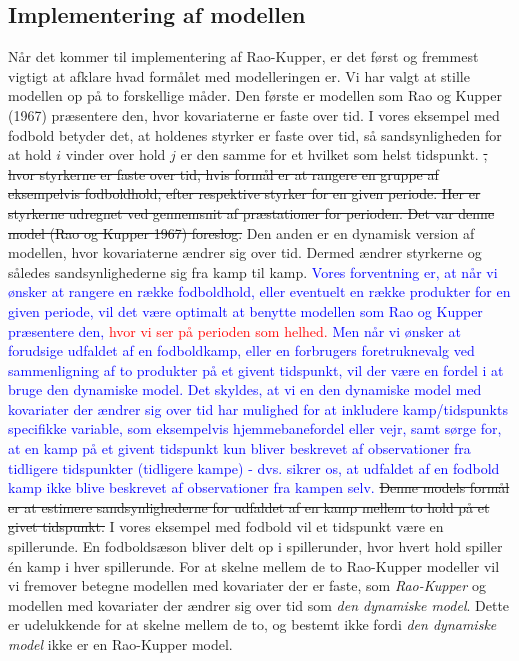 \documentclass[11pt,a4paper]{article}
\begin{document}
\subsection{Implementering af modellen}
Når det kommer til implementering af Rao-Kupper, er det først og fremmest vigtigt at afklare hvad formålet med modelleringen er. Vi har valgt at stille modellen op på to forskellige måder. Den første er modellen som Rao og Kupper (1967)\cite{RaoKupper} præsentere den, hvor kovariaterne er faste over tid. I vores eksempel med fodbold betyder det, at holdenes styrker er faste over tid, så sandsynligheden for at hold $i$ vinder over hold $j$ er den samme for et hvilket som helst tidspunkt.
\sout{, hvor styrkerne er faste over tid, hvis formål er at rangere en gruppe af eksempelvis fodboldhold, efter respektive styrker for en given periode. Her er styrkerne udregnet ved gennemsnit af præstationer for perioden. Det var denne model (Rao og Kupper 1967) foreslog.} 
Den anden er en dynamisk version af modellen, hvor kovariaterne ændrer sig over tid. Dermed ændrer styrkerne og således sandsynlighederne sig fra kamp til kamp. \textcolor{blue}{Vores forventning er, at når vi ønsker at rangere en række fodboldhold, eller eventuelt en række produkter for en given periode, vil det være optimalt at benytte modellen som Rao og Kupper præsentere den, \textcolor{red}{hvor vi ser på perioden som helhed.} Men når vi ønsker at forudsige udfaldet af en fodboldkamp, eller en forbrugers foretruknevalg ved sammenligning af to produkter på et givent tidspunkt, vil der være en fordel i at bruge den dynamiske model. Det skyldes, at vi en den dynamiske model med kovariater der ændrer sig over tid har mulighed for at inkludere kamp/tidspunkts specifikke variable, som eksempelvis hjemmebanefordel eller vejr, samt sørge for, at en kamp på et givent tidspunkt kun bliver beskrevet af observationer fra tidligere tidspunkter (tidligere kampe) - dvs. sikrer os, at udfaldet af en fodbold kamp ikke blive beskrevet af observationer fra kampen selv.}
\sout{Denne models formål er at estimere sandsynlighederne for udfaldet af en kamp mellem to hold på et givet tidspunkt.} I vores eksempel med fodbold vil et tidspunkt være en spillerunde. En fodboldsæson bliver delt op i spillerunder, hvor hvert hold spiller én kamp i hver spillerunde. For at skelne mellem de to Rao-Kupper modeller vil vi fremover betegne modellen med kovariater der er faste, som \textit{Rao-Kupper} og modellen med kovariater der ændrer sig over tid som \textit{den dynamiske model}. Dette er udelukkende for at skelne mellem de to, og bestemt ikke fordi \textit{den dynamiske model} ikke er en Rao-Kupper model.\par 
\end{document}
